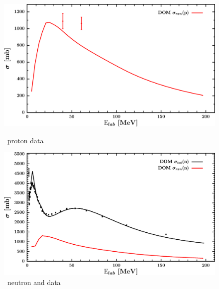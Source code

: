 \begin{figure}[H]
    \centering
    \begin{minipage}{0.45\textwidth}
        \centering
        \includegraphics[width=1.0\textwidth]{figures/ni64_protonInelastic.png}
        \caption{\niFour\ proton \rxn data}
        \label{DOMFitData_ni64_proton_inelastic}
    \end{minipage}\hfill
    \begin{minipage}{0.45\textwidth}
        \centering
        \includegraphics[width=1.0\textwidth]{figures/ni64_neutronInelastic.png}
        \caption{\niFour\ neutron \rxn and \tot data}
        \label{DOMFitData_ni64_neutron_inelastic}
    \end{minipage}
\end{figure}

\afterpage{\clearpage}

